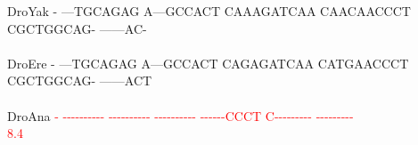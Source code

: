 \documentclass[11pt,twoside,reqno,a4paper]{article}
\begin{document}
{DroYak	-	---TGCAGAG	A---GCCACT	CAAAGATCAA	CAACAACCCT	CGCTGGCAG-	------AC-\\
\hspace*{7\charwidth}\hspace*{1\charwidth}\hspace*{1\charwidth}\hspace*{1\charwidth}\hspace*{1\charwidth}\hspace*{1\charwidth}\hspace*{1\charwidth}\\
DroEre	-	---TGCAGAG	A---GCCACT	CAGAGATCAA	CATGAACCCT	CGCTGGCAG-	------ACT\\
\hspace*{7\charwidth}\hspace*{1\charwidth}\hspace*{1\charwidth}\hspace*{1\charwidth}\hspace*{1\charwidth}\hspace*{1\charwidth}\hspace*{1\charwidth}\\
DroAna	\textcolor{Red}{-}	\textcolor{Red}{-}\textcolor{Red}{-}\textcolor{Red}{-}\textcolor{Red}{-}\textcolor{Red}{-}\textcolor{Red}{-}\textcolor{Red}{-}\textcolor{Red}{-}\textcolor{Red}{-}\textcolor{Red}{-}	\textcolor{Red}{-}\textcolor{Red}{-}\textcolor{Red}{-}\textcolor{Red}{-}\textcolor{Red}{-}\textcolor{Red}{-}\textcolor{Red}{-}\textcolor{Red}{-}\textcolor{Red}{-}\textcolor{Red}{-}	\textcolor{Red}{-}\textcolor{Red}{-}\textcolor{Red}{-}\textcolor{Red}{-}\textcolor{Red}{-}\textcolor{Red}{-}\textcolor{Red}{-}\textcolor{Red}{-}\textcolor{Red}{-}\textcolor{Red}{-}	\textcolor{Red}{-}\textcolor{Red}{-}\textcolor{Red}{-}\textcolor{Red}{-}\textcolor{Red}{-}\textcolor{Red}{-}\textcolor{Red}{C}\textcolor{Red}{C}\textcolor{Red}{C}\textcolor{Red}{T}	\textcolor{Red}{C}\textcolor{Red}{-}\textcolor{Red}{-}\textcolor{Red}{-}\textcolor{Red}{-}\textcolor{Red}{-}\textcolor{Red}{-}\textcolor{Red}{-}\textcolor{Red}{-}\textcolor{Red}{-}	\textcolor{Red}{-}\textcolor{Red}{-}\textcolor{Red}{-}\textcolor{Red}{-}\textcolor{Red}{-}\textcolor{Red}{-}\textcolor{Red}{-}\textcolor{Red}{-}\textcolor{Red}{-}\\
\hspace*{7\charwidth}\hspace*{0\charwidth}\textcolor{Red}{8.4}\hspace*{1\charwidth}\hspace*{1\charwidth}\hspace*{1\charwidth}\hspace*{1\charwidth}\hspace*{1\charwidth}\hspace*{1\charwidth}\\
}
\end{document}

